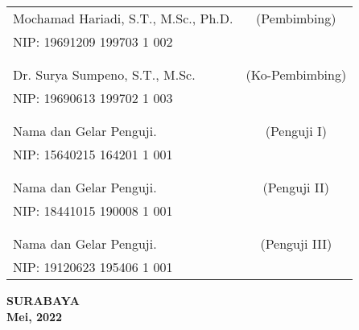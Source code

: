 \noindent
\begin{tabularx}{\textwidth}{X c}
  Mochamad Hariadi, S.T., M.Sc., Ph.D. & (Pembimbing)    \\
  NIP: 19691209 199703 1 002           &                 \\
                                       &                 \\
                                       &                 \\
  Dr. Surya Sumpeno, S.T., M.Sc.       & (Ko-Pembimbing) \\
  NIP: 19690613 199702 1 003           &                 \\
                                       &                 \\
                                       &                 \\
  Nama dan Gelar Penguji.              & (Penguji I)     \\
  NIP: 15640215 164201 1 001           &                 \\
                                       &                 \\
                                       &                 \\
  Nama dan Gelar Penguji.              & (Penguji II)    \\
  NIP: 18441015 190008 1 001           &                 \\
                                       &                 \\
                                       &                 \\
  Nama dan Gelar Penguji.              & (Penguji III)   \\
  NIP: 19120623 195406 1 001           &                 \\
\end{tabularx}
\endgroup

\vspace{4ex}

\begin{center}
  \textbf{SURABAYA} \\
  \textbf{Mei, 2022}
\end{center}
\endgroup
